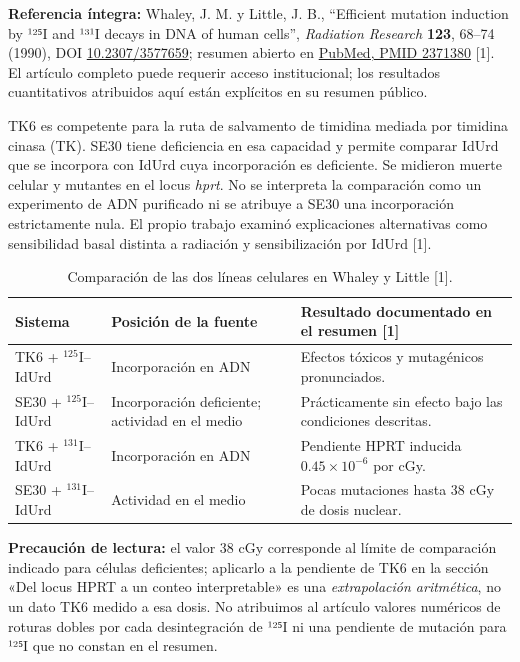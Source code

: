 \documentclass[11pt,a4paper,oneside]{article}
\begin{document}
\textbf{Referencia íntegra:} Whaley, J. M. y Little, J. B., ``Efficient mutation induction by ¹²⁵I and ¹³¹I decays in DNA of human cells'', \emph{Radiation Research} \textbf{123}, 68--74 (1990), DOI \href{https://doi.org/10.2307/3577659}{10.2307/3577659}; resumen abierto en \href{https://pubmed.ncbi.nlm.nih.gov/2371380/}{PubMed, PMID 2371380} {[}1{]}. El artículo completo puede requerir acceso institucional; los resultados cuantitativos atribuidos aquí están explícitos en su resumen público.

TK6 es competente para la ruta de salvamento de timidina mediada por timidina cinasa (TK). SE30 tiene deficiencia en esa capacidad y permite comparar IdUrd que se incorpora con IdUrd cuya incorporación es deficiente. Se midieron muerte celular y mutantes en el locus \emph{hprt}. No se interpreta la comparación como un experimento de ADN purificado ni se atribuye a SE30 una incorporación estrictamente nula. El propio trabajo examinó explicaciones alternativas como sensibilidad basal distinta a radiación y sensibilización por IdUrd {[}1{]}.

\begin{table}[htbp]\centering\small
\begin{tabularx}{\linewidth}{@{}p{.20\linewidth}p{.28\linewidth}X@{}}
\toprule Sistema & Posición de la fuente & Resultado documentado en el resumen [1]\\\midrule
TK6 + $^{125}$I--IdUrd & Incorporación en ADN & Efectos tóxicos y mutagénicos pronunciados.\\
SE30 + $^{125}$I--IdUrd & Incorporación deficiente; actividad en el medio & Prácticamente sin efecto bajo las condiciones descritas.\\
TK6 + $^{131}$I--IdUrd & Incorporación en ADN & Pendiente HPRT inducida $0.45\times10^{-6}$ por cGy.\\
SE30 + $^{131}$I--IdUrd & Actividad en el medio & Pocas mutaciones hasta 38 cGy de dosis nuclear.\\\bottomrule
\end{tabularx}
\caption{Comparación de las dos líneas celulares en Whaley y Little [1].}
\end{table}

\textbf{Precaución de lectura:} el valor \(38\) cGy corresponde al límite de comparación indicado para células deficientes; aplicarlo a la pendiente de TK6 en la sección «Del locus HPRT a un conteo interpretable» es una \emph{extrapolación aritmética}, no un dato TK6 medido a esa dosis. No atribuimos al artículo valores numéricos de roturas dobles por cada desintegración de ¹²⁵I ni una pendiente de mutación para ¹²⁵I que no constan en el resumen.
\end{document}
